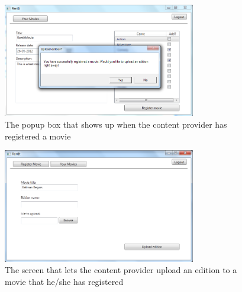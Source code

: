 \begin{figure}[h!]
  \centering
    \includegraphics[width=0.75\textwidth]{Parts/Appendix/Images/CPRegisterPopup}
  \caption{The popup box that shows up when the content provider has registered a movie}
  \label{fig:Appendix_GUI_PrototypeCPRegisterpopup}
\end{figure}

\begin{figure}[h!]
  \centering
    \includegraphics[width=0.75\textwidth]{Parts/Appendix/Images/CPUploadEdition}
  \caption{The screen that lets the content provider upload an edition to a movie that he/she has registered}
  \label{fig:Appendix_GUI_PrototypeCPUpload}
\end{figure}